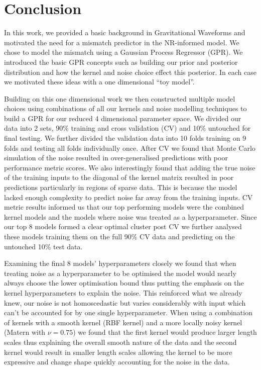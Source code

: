 \documentclass{ucdgradtaughtthesis}
\begin{document}
\chapter{Conclusion}
\label{sec:conclusion}

In this work, we provided a basic background in Gravitational Waveforms and motivated the need for a mismatch predictor in the NR-informed model.
We chose to model the mismatch using a Gaussian Process Regressor (GPR). 
We introduced the basic GPR concepts such as building our prior and posterior distribution and how the kernel and noise choice effect this posterior.
In each case we motivated these ideas with a one dimensional ``toy model''.  
%

Building on this one dimensional work we then constructed multiple model choices using combinations of all our kernels and noise modelling techniques to build a GPR for our reduced 4 dimensional parameter space.
We divided our data into 2 sets, 90\% training and cross validation (CV) and 10\% untouched for final testing. We further divided the validation data into 10 folds training on 9 folds and testing all folds individually once.
After CV we found that Monte Carlo simulation of the noise resulted in over-generalised predictions with poor performance metric scores.
We also interestingly found that adding the true noise of the training inputs to the diagonal of the kernel matrix resulted in poor predictions particularly in regions of sparse data.
This is because the model lacked enough complexity to predict noise far away from the training inputs. CV metric results informed us that our top performing models were the combined kernel models 
and the models where noise was treated as a hyperparameter. Since our top 8 models formed a clear optimal cluster post CV we further analysed these models training them on the full 90\% CV data
and predicting on the untouched 10\% test data. 
%

Examining the final 8 models' hyperparameters closely we found that when treating noise as a hyperparameter to be optimised the model would nearly always choose the lower optimisation bound 
thus putting the emphasis on the kernel hyperparameters to explain the noise.
This reinforced what we already knew, our noise is not homoscedastic but varies considerably with input which can't be accounted for by one single hyperparameter.
When using a combination of kernels with a smooth kernel (RBF kernel) and a 
more locally noisy kernel (Matern with \(\nu = 0.75\)) we found that the first kernel would produce larger length scales thus explaining the overall smooth nature of the data and the 
second kernel would result in smaller length scales allowing the kernel to be more expressive and change shape quickly accounting for the noise in the data. 
%
\end{document}
